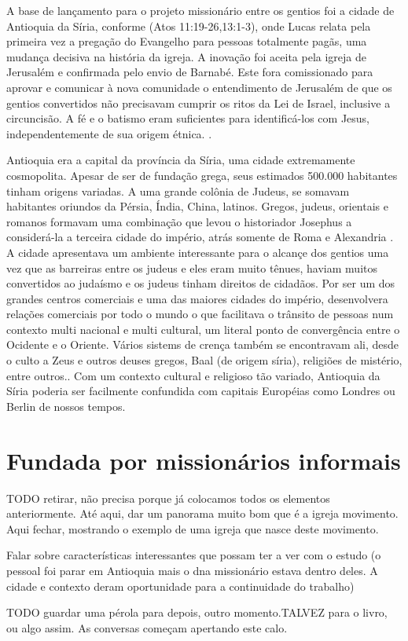 \documentclass[
	12pt,				%
	openright,			%
	twoside,			%
	a4paper,			%
	english,			%
	french,				%
	spanish,			%
	brazil				%
	]{abntex2}
\begin{document}
A base de lançamento para o projeto missionário entre os gentios foi a cidade de Antioquia da Síria, conforme (Atos 11:19-26,13:1-3), onde Lucas relata pela primeira vez a pregação do Evangelho para pessoas totalmente pagãs, uma mudança decisiva na história da igreja. A inovação foi aceita pela igreja de Jerusalém e confirmada pelo envio de Barnabé. Este fora comissionado para aprovar e comunicar à nova comunidade o entendimento de Jerusalém de que os gentios convertidos não precisavam cumprir os ritos da Lei de Israel, inclusive a circuncisão. A fé e o batismo eram suficientes para identificá-los com Jesus, independentemente de sua origem étnica. \cite[198]{green}.


Antioquia era a capital da província da Síria, uma cidade extremamente cosmopolita. Apesar de ser de fundação grega, seus estimados 500.000 habitantes tinham origens variadas. A uma grande colônia de Judeus, se somavam habitantes oriundos da Pérsia, Índia, China, latinos. Gregos, judeus, orientais e romanos formavam uma combinação que levou o historiador Josephus a considerá-la a terceira cidade do império, atrás somente de Roma e Alexandria \cite[185]{stott}. A cidade apresentava um ambiente interessante para o alcançe dos gentios uma vez que as barreiras entre os judeus e eles eram muito tênues, haviam muitos convertidos ao judaísmo e os judeus tinham direitos de cidadãos. Por ser um dos grandes centros comerciais e uma das maiores cidades do império, desenvolvera relações comerciais por todo o mundo o que facilitava o trânsito de pessoas num contexto multi nacional e multi cultural, um literal ponto de convergência entre o Ocidente e o Oriente. Vários sistems de crença também se encontravam ali, desde o culto a Zeus e outros deuses gregos, Baal (de origem síria), religiões de mistério, entre outros.\cite[166,167]{green}. Com um contexto cultural e religioso tão variado, Antioquia da Síria poderia ser facilmente  confundida com capitais Européias como Londres ou Berlin de nossos tempos.

\section{Fundada por missionários informais}
TODO retirar, não precisa porque já colocamos todos os elementos anteriormente. Até aqui, dar um panorama muito bom que é a igreja movimento. Aqui fechar, mostrando o exemplo de uma igreja que nasce deste movimento.

Falar sobre características interessantes que possam ter a ver com o estudo
(o pessoal foi parar em Antioquia mais o dna missionário estava dentro deles. A cidade e contexto deram oportunidade para a continuidade do trabalho)

TODO guardar uma pérola para depois, outro momento.TALVEZ para o livro, ou algo assim. As conversas começam apertando este calo.


\end{document}
